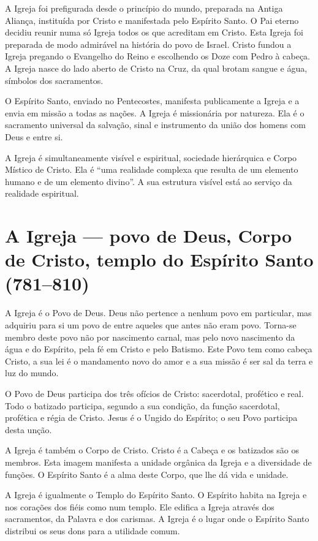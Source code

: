 A Igreja foi prefigurada desde o princípio do mundo, preparada na Antiga Aliança, instituída por Cristo e manifestada pelo Espírito Santo. O Pai eterno decidiu reunir numa só Igreja todos os que acreditam em Cristo. Esta Igreja foi preparada de modo admirável na história do povo de Israel. Cristo fundou a Igreja pregando o Evangelho do Reino e escolhendo os Doze com Pedro à cabeça. A Igreja nasce do lado aberto de Cristo na Cruz, da qual brotam sangue e água, símbolos dos sacramentos.

O Espírito Santo, enviado no Pentecostes, manifesta publicamente a Igreja e a envia em missão a todas as nações. A Igreja é missionária por natureza. Ela é o sacramento universal da salvação, sinal e instrumento da união dos homens com Deus e entre si.

A Igreja é simultaneamente visível e espiritual, sociedade hierárquica e Corpo Místico de Cristo. Ela é ``uma realidade complexa que resulta de um elemento humano e de um elemento divino''. A sua estrutura visível está ao serviço da realidade espiritual.

\section{A Igreja --- povo de Deus, Corpo de Cristo, templo do Espírito Santo (781--810)}

A Igreja é o Povo de Deus. Deus não pertence a nenhum povo em particular, mas adquiriu para si um povo de entre aqueles que antes não eram povo. Torna-se membro deste povo não por nascimento carnal, mas pelo novo nascimento da água e do Espírito, pela fé em Cristo e pelo Batismo. Este Povo tem como cabeça Cristo, a sua lei é o mandamento novo do amor e a sua missão é ser sal da terra e luz do mundo.

O Povo de Deus participa dos três ofícios de Cristo: sacerdotal, profético e real. Todo o batizado participa, segundo a sua condição, da função sacerdotal, profética e régia de Cristo. Jesus é o Ungido do Espírito; o seu Povo participa desta unção.

A Igreja é também o Corpo de Cristo. Cristo é a Cabeça e os batizados são os membros. Esta imagem manifesta a unidade orgânica da Igreja e a diversidade de funções. O Espírito Santo é a alma deste Corpo, que lhe dá vida e unidade.

A Igreja é igualmente o Templo do Espírito Santo. O Espírito habita na Igreja e nos corações dos fiéis como num templo. Ele edifica a Igreja através dos sacramentos, da Palavra e dos carismas. A Igreja é o lugar onde o Espírito Santo distribui os seus dons para a utilidade comum.

